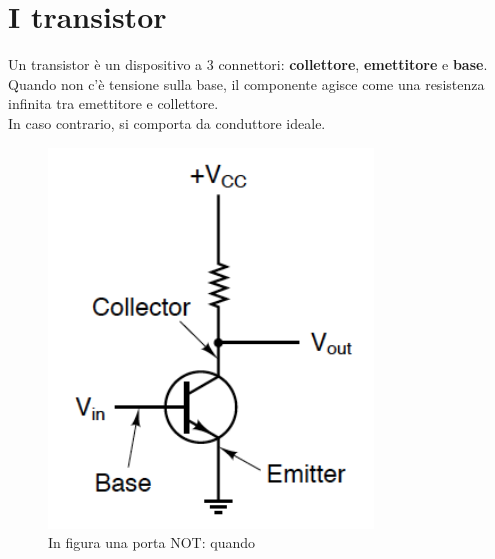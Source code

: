 \documentclass[12pt]{article}
\begin{document}
\section{I transistor}
Un transistor è un dispositivo a 3 connettori: \textbf{collettore}, \textbf{emettitore} e \textbf{base}.\\
Quando non c'è tensione sulla base, il componente agisce come una resistenza infinita tra emettitore e collettore.\\
In caso contrario, si comporta da conduttore ideale.
\begin{figure}[!htb]
    \centering
    \includegraphics[width=.7\textwidth, height=.7\textheight,keepaspectratio]{porte_logiche/transistor_not_ex.png} %
    \begin{center}
        \caption{\label{fig:transistor_not_esempio} In figura una porta NOT: quando \textit{}} %
    \end{center}
\end{figure}\\
\end{document}
